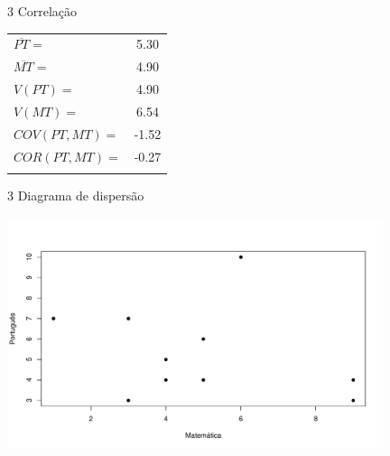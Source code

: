 \documentclass[
  ignorenonframetext,
  serif,
  professionalfont,
  usenames,
  dvipsnames,
  aspectratio = 169]{beamer}
\begin{document}
\begin{frame}{3 Correlação}
\footnotesize

\begin{longtable}[]{@{}lc@{}}
\toprule\noalign{}
\endhead
\(\overline{PT} =\) & 5.30 \\
\(\overline{MT} =\) & 4.90 \\
\(V(PT) =\) & 4.90 \\
\(V(MT) =\) & 6.54 \\
\(COV(PT,MT) =\) & -1.52 \\
\(COR(PT,MT) =\) & -0.27 \\
\bottomrule\noalign{}
\end{longtable}
\end{frame}

\begin{frame}{3 Diagrama de dispersão}
\label{diagrama-de-dispersuxe3o}
\begin{center}\includegraphics[width=11cm]{exercicios-encontro2-solucao_files/figure-beamer/unnamed-chunk-27-1} \end{center}
\end{frame}
\end{document}
